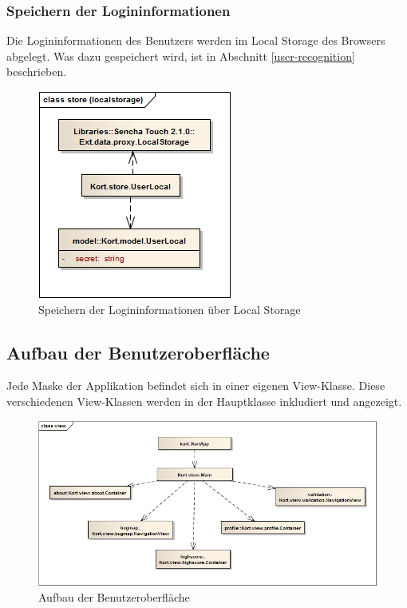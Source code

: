 \subsubsection{Speichern der Logininformationen}
Die Logininformationen des Benutzers werden im \gls{Local Storage} des Browsers abgelegt.
Was dazu gespeichert wird, ist in Abschnitt \ref{user-recognition} beschrieben.

\begin{figure}[H]
	\centering
	\includegraphics[scale=0.6]{images/uml/kort-classdiagram-store_localstorage}
	\caption{Speichern der Logininformationen über Local Storage}
	\label{image-kort-classdiagram-store_localstorage}
\end{figure}

\subsection{Aufbau der Benutzeroberfläche}
Jede Maske der Applikation befindet sich in einer eigenen View-Klasse.
Diese verschiedenen View-Klassen werden in der Hauptklasse  inkludiert und angezeigt.

\begin{figure}[H]
	\centering
	\includegraphics[width=\textwidth]{images/uml/kort-classdiagram-view}
	\caption{Aufbau der Benutzeroberfläche}
	\label{image-kort-classdiagram-view}
\end{figure}